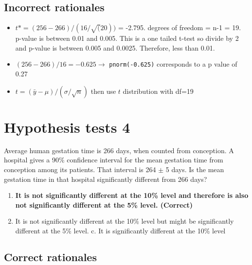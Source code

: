 \documentclass[letterpaper,9pt,twoside,printwatermark=false]{pinp}
\providecommand{\tightlist}{%
  \setlength{\itemsep}{0pt}\setlength{\parskip}{0pt}}
\begin{document}
\hypertarget{incorrect-rationales-2}{%
\subsection{Incorrect rationales}\label{incorrect-rationales-2}}

\begin{itemize}
\tightlist
\item
  \(t* = (256-266) / (16 / \sqrt(20))\) = -2.795. degrees of freedom =
  n-1 = 19. p-value is between 0.01 and 0.005. This is a one tailed
  t-test so divide by 2 and p-value is between 0.005 and 0.0025.
  Therefore, less than 0.01.
\item
  \((256 - 266)/16 = -0.625 \to\) \texttt{pnorm(-0.625)} corresponds to
  a p value of 0.27
\item
  \(t = (\bar{y}-\mu)/(\sigma/\sqrt{n})\) then use \(t\) distribution
  with df=19
\end{itemize}

\hypertarget{hypothesis-tests-4}{%
\section{Hypothesis tests 4}\label{hypothesis-tests-4}}

Average human gestation time is 266 days, when counted from conception.
A hospital gives a 90\% confidence interval for the mean gestation time
from conception among its patients. That interval is 264 \(\pm\) 5 days.
Is the mean gestation time in that hospital significantly different from
266 days?

\begin{enumerate}
\def\labelenumi{\alph{enumi}.}
\tightlist
\item
  \textbf{It is not significantly different at the 10\% level and
  therefore is also not significantly different at the 5\% level.
  (Correct)}
\item
  It is not significantly different at the 10\% level but might be
  significantly different at the 5\% level. c. It is significantly
  different at the 10\% level
\end{enumerate}

\hypertarget{correct-rationales-3}{%
\subsection{Correct rationales}\label{correct-rationales-3}}
\end{document}
